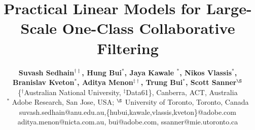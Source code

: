 \documentclass{article}
\begin{document}








\title{Practical Linear Models for Large-Scale One-Class Collaborative Filtering}


\author { \textbf{Suvash Sedhain$^{\dag\ddagger}$, Hung Bui$^{*}$, Jaya Kawale $^{*}$, Nikos Vlassis$^{*}$,} \\ \textbf{Branislav Kveton$^{*}$, Aditya Menon$^{\ddagger\dag}$, Trung Bui$^{*}$, Scott Sanner$^{\S}$}\\
\{$^{\dag}$Australian National University, $^{\ddagger}$Data61\}, Canberra, ACT, Australia\\
$^{*}$ Adobe Research, San Jose,  USA;
$^{\S}$  University of Toronto, Toronto, Canada\\
suvash.sedhain@anu.edu.au,\{hubui,kawale,vlassis,kveton\}@adobe.com\\ aditya.menon@nicta.com.au, bui@adobe.com, ssanner@mie.utoronto.ca
}%
\end{document}
